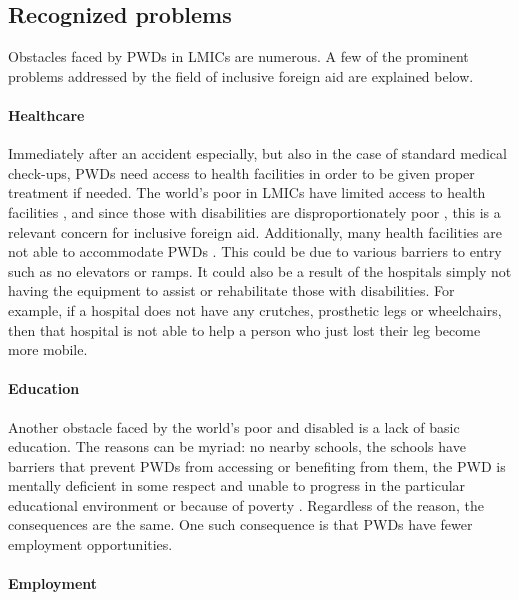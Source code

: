 \documentclass[a4paper]{article}
\begin{document}
\subsection{Recognized problems}

Obstacles faced by PWDs in LMICs are numerous. A few of the prominent problems
addressed by the field of inclusive foreign aid are explained below.

\paragraph{Healthcare}

Immediately after an accident especially, but also in the case of standard
medical check-ups, PWDs need access to health facilities in order to be given
proper treatment if needed. The world's poor in LMICs have limited access to
health facilities \citep{peters2008poverty}, and since those with disabilities
are disproportionately poor \citep{mitra2018disability}, this is a relevant
concern for inclusive foreign aid. Additionally, many health facilities are
not able to accommodate PWDs \citep{drainoni2006cross}. This could be due to
various barriers to entry such as no elevators or ramps. It could also be a
result of the hospitals simply not having the equipment to assist or
rehabilitate those with disabilities. For example, if a hospital does not have
any crutches, prosthetic legs or wheelchairs, then that hospital is not able
to help a person who just lost their leg become more mobile.

\paragraph{Education}

Another obstacle faced by the world’s poor and disabled is a lack of basic
education. The reasons can be myriad: no nearby schools, the schools have
barriers that prevent PWDs from accessing or benefiting from them, the PWD is
mentally deficient in some respect and unable to progress in the particular
educational environment or because of poverty \citep{ingstad2011disability}.
Regardless of the reason, the consequences are the same. One such consequence
is that PWDs have fewer employment opportunities.

\paragraph{Employment}
\end{document}
